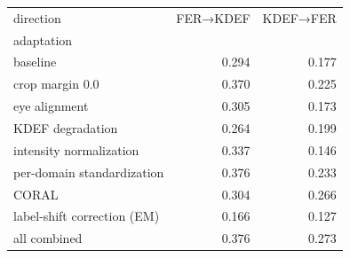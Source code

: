 \begin{tabular}{lrr}
\toprule
direction & FER→KDEF & KDEF→FER \\
adaptation &  &  \\
\midrule
baseline & 0.294 & 0.177 \\
crop margin 0.0 & 0.370 & 0.225 \\
eye alignment & 0.305 & 0.173 \\
KDEF degradation & 0.264 & 0.199 \\
intensity normalization & 0.337 & 0.146 \\
per-domain standardization & 0.376 & 0.233 \\
CORAL & 0.304 & 0.266 \\
label-shift correction (EM) & 0.166 & 0.127 \\
all combined & 0.376 & 0.273 \\
\bottomrule
\end{tabular}
